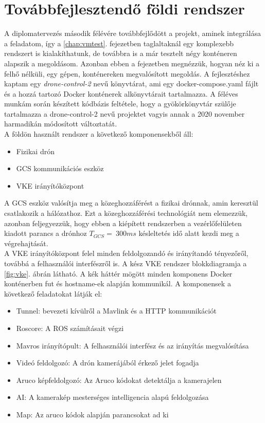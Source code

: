 \chapter{Továbbfejlesztendő földi rendszer}
A diplomatervezés második félévére továbbfejlődött a projekt, aminek integrálása a feladatom, így a \ref{chap:vmtest}. fejezetben taglaltaknál egy komplexebb rendszert is kialakíthatunk, de továbbra is a már tesztelt négy konténeren alapszik a megoldásom. Azonban ebben a fejezetben megnézzük, hogyan néz ki a felhő nélküli, egy gépen, konténereken megvalósított megoldás. A fejlesztéshez kaptam egy \emph{drone-control-2} nevű könyvtárat, ami egy docker-compose.yaml fájlt és a hozzá tartozó Docker konténerek alkönyvtárait tartalmazza. A féléves munkám során készített kódbázis feltétele, hogy a gyökörkönyvtár szülője tartalmazza a drone-control-2 nevű projektet vagyis annak a 2020 november harmadikán módosított változtatát. \\

\noindent
A földön használt rendszer a következő komponensekből áll:
\begin{itemize}
	\item Fizikai drón
	\item GCS kommunikációs eszköz
	\item VKE irányítóközpont
\end{itemize}

\noindent
A GCS eszköz valósítja meg a közeghozzáférést a fizikai drónnak, amin keresztül csatlakozik a hálózathoz. Ezt a közeghozzáférési technológiát nem elemezzük, azonban feljegyezzük, hogy ebben a kiépített rendszerben a vezérlőfelületen kiadott parancs a drónhoz $T_{GCS} = ~300 ms$ késleltetés idő alatt kezdi meg a végrehajtását. \\

\noindent
A VKE irányítóközpont felel minden feldolgozandó és irányítandó tényezőről, továbbá a felhasználói interfészről is. A kész VKE rendszer blokkdiagramja a \ref{fig:vke}. ábrán látható. A kék háttér mögött minden komponens Docker konténerben fut és hostname-ek alapján kommunikál. A komponensek a következő feladatokat látják el:
\begin{itemize}
	\item Tunnel: bevezeti kívülről a Mavlink és a HTTP kommunikációt
	\item Roscore: A ROS számításait végzi
	\item Mavros irányítópult: A felhasználói interfész és az irányítás megvalósítása
	\item Videó feldolgozó: A drón kamerájából érkező jelet fogadja
	\item Aruco képfeldolgozó: Az Aruco kódokat detektálja a kamerajelen
	\item AI: A kamerakép mesterséges intelligencia alapú feldolgozása
	\item Map: Az aruco kódok alapján parancsokat ad ki
\end{itemize}


